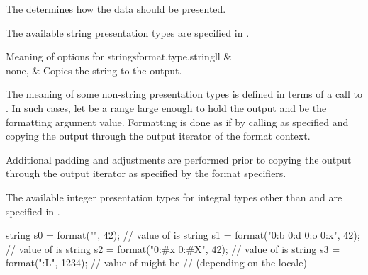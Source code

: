 \pnum
The  determines how the data should be presented.

\pnum
The available string presentation types are specified in .
%
\begin{floattable}{Meaning of  options for strings}{format.type.string}{ll}
\topline
{} &  \\ \rowsep
none,  &
Copies the string to the output.
\\
\end{floattable}

\pnum
The meaning of some non-string presentation types
is defined in terms of a call to .
In such cases,
let  be a range
large enough to hold the  output
and  be the formatting argument value.
Formatting is done as if by calling  as specified
and copying the output through the output iterator of the format context.
\begin{note}
Additional padding and adjustments are performed
prior to copying the output through the output iterator
as specified by the format specifiers.
\end{note}

\pnum
The available integer presentation types
for integral types other than  and 
are specified in .
\begin{example}
\begin{codeblock}
string s0 = format("{}", 42);                           // value of  is 
string s1 = format("{0:b} {0:d} {0:o} {0:x}", 42);      // value of  is 
string s2 = format("{0:#x} {0:#X}", 42);                // value of  is 
string s3 = format("{:L}", 1234);                       // value of  might be 
                                                        // (depending on the locale)
\end{codeblock}
\end{example}

